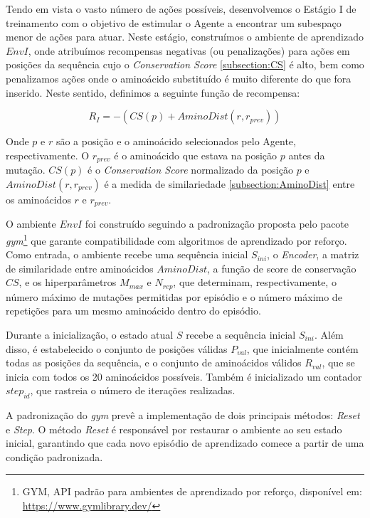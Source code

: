 Tendo em vista o vasto número de ações possíveis, 
desenvolvemos o Estágio I de treinamento com o objetivo de estimular o Agente a encontrar um subespaço menor de ações para atuar.
Neste estágio, construímos o ambiente de aprendizado $EnvI$, onde atribuímos recompensas negativas (ou penalizações) 
para ações em posições da sequência cujo o \textit{Conservation Score} \ref{subsection:CS} é alto,
bem como penalizamos ações onde o aminoácido substituído é muito diferente do que fora inserido. 
Neste sentido, definimos a seguinte função de recompensa:

\begin{equation}
    R_{I} = -(CS(p) + AminoDist(r, r_{prev}))
\end{equation}

\noindent
Onde $p$ e $r$ são a posição e o aminoácido selecionados pelo Agente, respectivamente. 
O $r_{prev}$ é o aminoácido que estava na posição $p$ antes da mutação. 
$CS(p)$ é o \textit{Conservation Score} normalizado da posição $p$ e $AminoDist(r, r_{prev})$ 
é a medida de similariedade \ref{subsection:AminoDist} entre os aminoácidos $r$ e $r_{prev}$.

O ambiente $EnvI$ foi construído seguindo a padronização proposta 
pelo pacote \textit{gym}\footnote{GYM, API padrão para ambientes de aprendizado por reforço, disponível em: \url{https://www.gymlibrary.dev/}} 
que garante compatibilidade com algoritmos de aprendizado por reforço.
Como entrada, o ambiente recebe uma sequência inicial $S_{ini}$, 
o \textit{Encoder}, a matriz de similaridade entre aminoácidos $\textit{AminoDist}$,
a função de score de conservação $CS$, 
e os hiperparâmetros $M_{max}$ e $N_{rep}$, que determinam, respectivamente,
o número máximo de mutações permitidas por episódio e o número máximo de repetições para um mesmo aminoácido dentro do episódio.

Durante a inicialização, 
o estado atual $S$ recebe a sequência inicial $S_{ini}$. 
Além disso, é estabelecido o conjunto de posições válidas $P_{val}$,
que inicialmente contém todas as posições da sequência, 
e o conjunto de aminoácidos válidos $R_{val}$, 
que se inicia com todos os 20 aminoácidos possíveis. 
Também é inicializado um contador $step_{id}$, 
que rastreia o número de iterações realizadas.

A padronização do \textit{gym} prevê a implementação de dois principais métodos: \textit{Reset} e \textit{Step}.
O método \textit{Reset} é responsável por restaurar o ambiente ao seu estado inicial,
garantindo que cada novo episódio de aprendizado comece a partir de uma condição padronizada.

